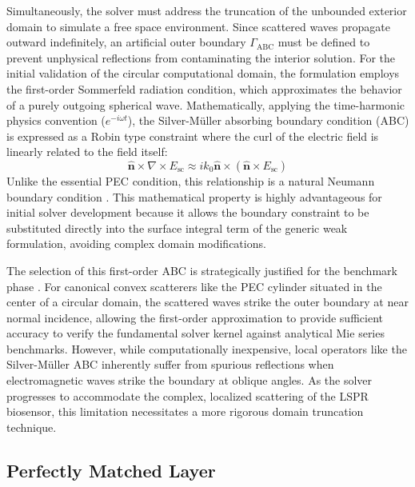 Simultaneously, the solver must address the truncation of the unbounded exterior domain to simulate a free space environment. Since scattered waves propagate outward indefinitely, an artificial outer boundary $\Gamma_{\text{ABC}}$ must be defined to prevent unphysical reflections from contaminating the interior solution. For the initial validation of the circular computational domain, the formulation employs the first-order Sommerfeld radiation condition, which approximates the behavior of a purely outgoing spherical wave. Mathematically, applying the time-harmonic physics convention ($e^{-i\omega t}$), the Silver-M\"{u}ller absorbing boundary condition (ABC) is expressed as a Robin type constraint where the curl of the electric field is linearly related to the field itself:
\begin{equation}
\hat{\bm{n}} \times \nabla \times E_{\text{sc}} \approx ik_0 \hat{\bm{n}} \times (\hat{\bm{n}} \times E_{\text{sc}})
\label{eq:abc}
\end{equation}
Unlike the essential PEC condition, this relationship is a natural Neumann boundary condition \citep{Jin2015}. This mathematical property is highly advantageous for initial solver development because it allows the boundary constraint to be substituted directly into the surface integral term of the generic weak formulation, avoiding complex domain modifications.

\vspace{12pt}

The selection of this first-order ABC is strategically justified for the benchmark phase \citep{Sjoberg2025}. For canonical convex scatterers like the PEC cylinder situated in the center of a circular domain, the scattered waves strike the outer boundary at near normal incidence, allowing the first-order approximation to provide sufficient accuracy to verify the fundamental solver kernel against analytical Mie series benchmarks. However, while computationally inexpensive, local operators like the Silver-M\"{u}ller ABC inherently suffer from spurious reflections when electromagnetic waves strike the boundary at oblique angles. As the solver progresses to accommodate the complex, localized scattering of the LSPR biosensor, this limitation necessitates a more rigorous domain truncation technique.

\subsection{Perfectly Matched Layer}


